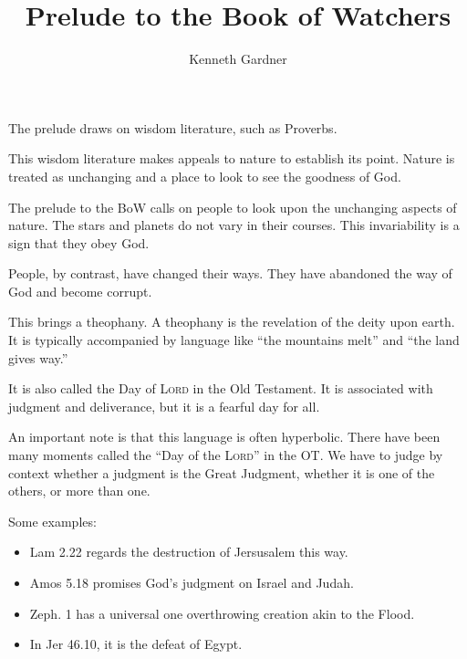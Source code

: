 \documentclass{beamer}
\title{Prelude to the Book of Watchers}
\author{Kenneth Gardner}
\begin{document}
\maketitle

\begin{frame}
  The prelude draws on wisdom literature, such as Proverbs.
\end{frame}

\begin{frame}
  This wisdom literature makes appeals to nature to establish its point.
  Nature is treated as unchanging and a place to look to see the goodness of God.
\end{frame}

\begin{frame}
  The prelude to the BoW calls on people to look upon the unchanging aspects of nature.
  The stars and planets do not vary in their courses.
  This invariability is a sign that they obey God.
\end{frame}

\begin{frame}
  People, by contrast, have changed their ways.
  They have abandoned the way of God and become corrupt.
\end{frame}

\begin{frame}
  This brings a theophany.
  A theophany is the revelation of the deity upon earth.
  It is typically accompanied by language like ``the mountains melt'' and ``the land gives way.''
\end{frame}

\begin{frame}
  It is also called the Day of \textsc{Lord} in the Old Testament.
  It is associated with judgment and deliverance, but it is a fearful day for all.
\end{frame}

\begin{frame}
  An important note is that this language is often hyperbolic.
  There have been many moments called the ``Day of the \textsc{Lord}'' in the OT.
  We have to judge by context whether a judgment is the Great Judgment, whether it is one of the others, or more than one.
\end{frame}

\begin{frame}
  Some examples:\pause
  \begin{itemize}
	\item Lam 2.22 regards the destruction of Jersusalem this way.\pause
	\item Amos 5.18 promises God's judgment on Israel and Judah.\pause
	\item Zeph. 1 has a universal one overthrowing creation akin to the Flood.\pause
	\item In Jer 46.10, it is the defeat of Egypt.
  \end{itemize}
\end{frame}
\end{document}
